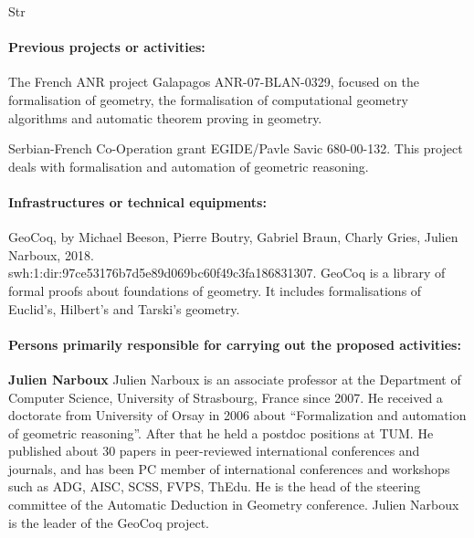 \begin{sitedescription}{Str}
\paragraph*{Previous projects or activities:}

\begin{compactitem}
\item The French ANR project Galapagos ANR-07-BLAN-0329, focused on the formalisation of geometry, the formalisation of computational geometry algorithms and automatic theorem proving in geometry.
\item Serbian-French Co-Operation grant EGIDE/Pavle Savic 680-00-132. This project deals with formalisation and automation of geometric reasoning.
\end{compactitem}

\paragraph*{Infrastructures or technical equipments:}

\begin{compactitem}
\item GeoCoq, by Michael Beeson, Pierre Boutry, Gabriel Braun, Charly Gries, Julien Narboux, 2018.\\swh:1:dir:97ce53176b7d5e89d069bc60f49c3fa186831307. GeoCoq is a library of formal proofs about foundations of geometry. It includes formalisations of Euclid's, Hilbert's and Tarski's geometry.
\end{compactitem}

\paragraph*{Persons primarily responsible for carrying out the proposed activities:}

\begin{compactitem}
\item{\bf Julien Narboux}
Julien Narboux is an associate professor at the Department of Computer Science, University of Strasbourg, France since 2007. He received a doctorate from University of Orsay in 2006 about “Formalization and automation of geometric reasoning”. After that he held a postdoc positions at TUM.
He published about 30 papers in peer-reviewed international conferences and journals, and has been PC member of international conferences and workshops such as ADG, AISC, SCSS, FVPS, ThEdu. He is the head of the steering committee of the Automatic Deduction in Geometry conference. Julien Narboux is the leader of the GeoCoq project.


\end{compactitem}
\end{sitedescription}
